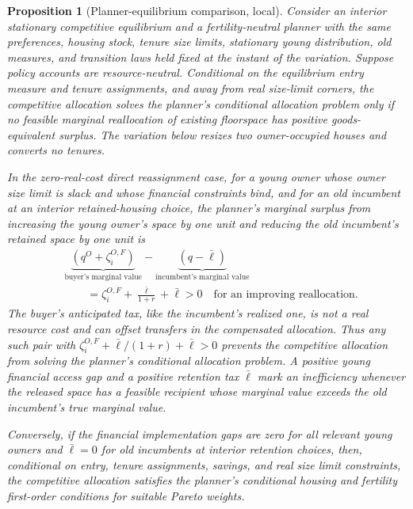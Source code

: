 \documentclass[11pt]{article}
\newtheorem{proposition}{Proposition}
\newcommand{\1}{\mathbf 1}
\begin{document}
\begin{proposition}[Planner-equilibrium comparison, local]
Consider an interior stationary competitive equilibrium and a fertility-neutral planner with the same preferences, housing stock, tenure size limits, stationary young distribution, old measures, and transition laws held fixed at the instant of the variation. Suppose policy accounts are resource-neutral. Conditional on the equilibrium entry measure and tenure assignments, and away from real size-limit corners, the competitive allocation solves the planner's conditional allocation problem only if no feasible marginal reallocation of existing floorspace has positive goods-equivalent surplus. The variation below resizes two owner-occupied houses and converts no tenures.

In the zero-real-cost direct reassignment case, for a young owner whose owner size limit is slack and whose financial constraints bind, and for an old incumbent at an interior retained-housing choice, the planner's marginal surplus from increasing the young owner's space by one unit and reducing the old incumbent's retained space by one unit is
\[
\begin{aligned}
&\underbrace{\left(q^O+\zeta_i^{O,F}\right)}_{\text{buyer's marginal value}}
-\underbrace{\left(q-\bar\ell\right)}_{\text{incumbent's marginal value}}
\\
&\qquad
=
\zeta_i^{O,F}+\frac{\bar\ell}{1+r}+\bar\ell
>0
\quad\text{for an improving reallocation}.
\end{aligned}
\]
The buyer's anticipated tax, like the incumbent's realized one, is not a real resource cost and can offset transfers in the compensated allocation.
Thus any such pair with $\zeta_i^{O,F}+\bar\ell/(1+r)+\bar\ell>0$ prevents the competitive allocation from solving the planner's conditional allocation problem. A positive young financial access gap and a positive retention tax $\bar\ell$ mark an inefficiency whenever the released space has a feasible recipient whose marginal value exceeds the old incumbent's true marginal value.

Conversely, if the financial implementation gaps are zero for all relevant young owners and $\bar\ell=0$ for old incumbents at interior retention choices, then, conditional on entry, tenure assignments, savings, and real size limit constraints, the competitive allocation satisfies the planner's conditional housing and fertility first-order conditions for suitable Pareto weights.
\end{proposition}
\end{document}
